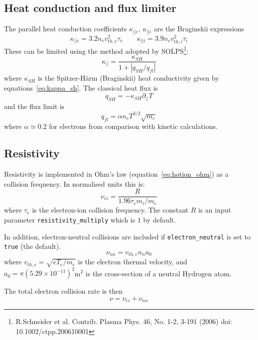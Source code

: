 \documentclass[12pt,a4paper]{article}
\begin{document}
\subsection{Heat conduction and flux limiter}

The parallel heat conduction coefficients $\kappa_{||e}$, $\kappa_{||i}$ are
the Braginskii expressions
\begin{equation}
  \kappa_{||e} = 3.2n_ev_{th,e}^2 \tau_e \qquad \kappa_{||i} = 3.9n_ev_{th,i}^2 \tau_i
  \label{eq:kappa_sh}
\end{equation}
These can be limited using the method adopted by SOLPS\footnote{R.Schneider et al. Contrib. Plasma Phys. 46, No. 1-2, 3-191 (2006) doi: 10.1002/ctpp.200610001}:
\begin{equation}
\kappa_{||} = \frac{\kappa_{SH}}{1 + \left|q_{SH} / q_{fl}\right|}
\end{equation}
where $\kappa_{SH}$ is the Spitzer-H\"arm (Braginskii) heat conductivity given by equations~\ref{eq:kappa_sh}. The classical heat flux is
\begin{equation}
q_{SH} = -\kappa_{SH} \partial_{||}T
\end{equation}
and the flux limit is
\begin{equation}
q_{fl} = \alpha n_e T^{3/2}\sqrt{m_e}
\end{equation}
where $\alpha\simeq 0.2$ for electrons from comparison with kinetic calculations.

\subsection{Resistivity}

Resistivity is implemented in Ohm's law (equation~\ref{eq:hotion_ohm}) as a collision frequency. In normalised units this is:
\[
\nu_{ei} = \frac{R}{1.96\tau_e m_i/m_e}
\]
where $\tau_e$ is the electron-ion collision frequency. The constant $R$ is an input parameter \texttt{resistivity\_multiply} which is $1$ by default.

In addition, electron-neutral collisions are included if \texttt{electron\_neutral} is set to \texttt{true} (the default).
\[
\nu_{nn} = v_{th,e} n_n a_0
\]
where $v_{th,e} = \sqrt{eT_e/m_e}$ is the electron thermal velocity, and $a_0 = \pi \left(5.29\times 10^{-11}\right)^2$m$^2$
 is the cross-section of a neutral Hydrogen atom.

The total electron collision rate is then
\begin{equation}
\nu = \nu_{ei} + \nu_{nn}
\end{equation}
\end{document}
